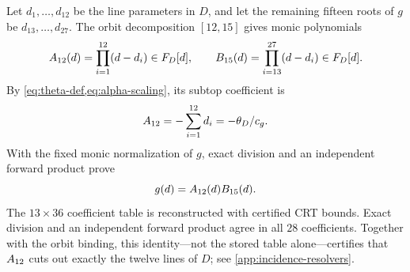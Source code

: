 Let \(d_1,\ldots,d_{12}\) be the line parameters in \(D\), and let the
remaining fifteen roots of \(g\) be \(d_{13},\ldots,d_{27}\).  The orbit
decomposition \([12,15]\) gives monic polynomials
\begin{equation}
 A_{12}(d)=\prod_{i=1}^{12}(d-d_i)\in F_D[d],\qquad
 B_{15}(d)=\prod_{i=13}^{27}(d-d_i)\in F_D[d].
\label{eq:carrier-factors}
\end{equation}
By \cref{eq:theta-def,eq:alpha-scaling}, its subtop coefficient is
\begin{equation}
 [d^{11}]\Acarrier=-\sum_{i=1}^{12}d_i=-\theta_D/c_g.
\label{eq:carrier-subtop}
\end{equation}
With the fixed monic normalization of \(g\), exact division and an independent
forward product prove
\begin{equation}
 g(d)=A_{12}(d)B_{15}(d).
\label{eq:carrier-identity}
\end{equation}
The \(13\times36\) coefficient table is reconstructed with certified CRT
bounds.  Exact division and an independent forward product agree in all
\(28\) coefficients.  Together with the orbit binding, this identity---not
the stored table alone---certifies that \(A_{12}\) cuts out exactly the
twelve lines of \(D\); see \cref{app:incidence-resolvers}.
